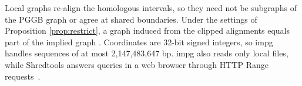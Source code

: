 Local graphs re-align the homologous intervals, so they need not be subgraphs of the PGGB graph or agree at shared boundaries.
Under the settings of Proposition \ref{prop:restrict}, a graph induced from the clipped alignments equals part of the implied graph .
Coordinates are 32-bit signed integers, so impg handles sequences of at most 2,147,483,647 bp.
impg also reads only local files, while Shredtools answers queries in a web browser through HTTP Range requests~\citep{Shivakumar2026shredtools}.

